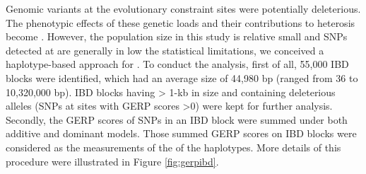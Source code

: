 \documentclass[9pt,twocolumn,twoside]{gsajnl}
\begin{document}
Genomic variants \DIFdelbegin {}\DIFdelend \DIFaddbegin {}\DIFaddend at the evolutionary constraint sites were potentially deleterious. The phenotypic effects of these genetic loads and their contributions to heterosis become \DIFdelbegin {}\DIFdelend \DIFaddbegin {}\DIFaddend . However, the population size in this study is relative small and SNPs detected at \DIFdelbegin {}\DIFdelend \DIFaddbegin {}\DIFaddend are generally in low \DIFdelbegin {}\DIFdelend \DIFaddbegin {}\DIFaddend the statistical limitations, we conceived a haplotype-based approach for \DIFdelbegin {}\DIFdelend \DIFaddbegin {}\DIFaddend . To conduct the analysis, first of all, 55,000 IBD blocks were identified, which had an average size of 44,980 bp (ranged from 36 to 10,320,000 bp). IBD blocks having > 1-kb in size and containing \DIFdelbegin {}\DIFdelend \DIFaddbegin {}\DIFaddend deleterious alleles (SNPs at sites with GERP scores >0) were kept for further analysis. Secondly, the GERP scores of SNPs in an IBD block were summed under both additive and dominant models. Those summed GERP scores on IBD blocks were considered as the measurements of the \DIFdelbegin {}\DIFdelend \DIFaddbegin {}\DIFaddend of the haplotypes. More details of this procedure were illustrated in Figure \ref{fig:gerpibd}.      
\end{document}
